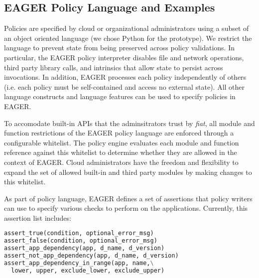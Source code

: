 \subsection{EAGER Policy Language and Examples}
\label{sec:policy-lang}
Policies are specified by cloud
or organizational administrators using a subset of an object oriented language
(we chose Python for the prototype).
We restrict the language to prevent state from being preserved across
policy validations. In particular, the EAGER policy interpreter disables 
file and network operations, third party library calls, 
and intrinsics that allow
state to persist across invocations.  
In addition, EAGER processes each 
policy independently of others (i.e. each policy must be self-contained and 
access no external state).  All other language constructs and 
language features can be used to specify policies in EAGER.

To accomodate built-in APIs that the adminsitrators trust by {\em fiat},
all module and function restrictions of the EAGER policy language are enforced
through a configurable whitelist. The policy engine evaluates each module and function
reference against this whitelist to determine whether they are allowed in the context of
EAGER. Cloud administrators have the freedom
and flexibility to expand the set of allowed built-in and third party modules by making
changes to this whitelist.

As part of policy language, EAGER
defines a set of assertions that policy writers can use to specify various 
checks to perform on the applications. 
Currently, this assertion list includes:

\vspace{0.05in}
{\footnotesize 
\begin{lstlisting}[language=Python, frame=single]
assert_true(condition, optional_error_msg)
assert_false(condition, optional_error_msg)
assert_app_dependency(app, d_name, d_version)
assert_not_app_dependency(app, d_name, d_version)
assert_app_dependency_in_range(app, name,\
  lower, upper, exclude_lower, exclude_upper)
\end{lstlisting}
}


